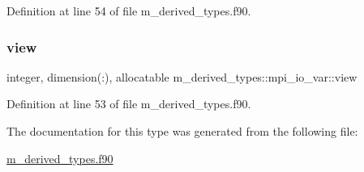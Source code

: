 Definition at line 54 of file m\+\_\+derived\+\_\+types.\+f90.

\mbox{\label{structm__derived__types_1_1mpi__io__var_a19194d57a71bab3f81f1bb6c05743fed}} 
\subsubsection{\texorpdfstring{view}{view}}
{\footnotesize\ttfamily integer, dimension(\+:), allocatable m\+\_\+derived\+\_\+types\+::mpi\+\_\+io\+\_\+var\+::view}



Definition at line 53 of file m\+\_\+derived\+\_\+types.\+f90.



The documentation for this type was generated from the following file\+:\begin{DoxyCompactItemize}
\item 
\hyperlink{m__derived__types_8f90}{m\+\_\+derived\+\_\+types.\+f90}\end{DoxyCompactItemize}
